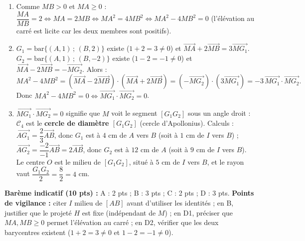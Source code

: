 \documentclass[11pt]{article}
\begin{document}
\begin{corrige}
\begin{enumerate}
\item Comme $MB>0$ et $MA\ge 0$ : $\dfrac{MA}{MB}=2\iff MA=2MB\iff MA^2=4MB^2\iff MA^2-4MB^2=0$ (l'élévation au carré est licite car les deux membres sont positifs).
\item $G_1=\mathrm{bar}\{(A,1)\,;\,(B,2)\}$ existe ($1+2=3\neq 0$) et $\overrightarrow{MA}+2\overrightarrow{MB}=3\overrightarrow{MG_1}$. $G_2=\mathrm{bar}\{(A,1)\,;\,(B,-2)\}$ existe ($1-2=-1\neq 0$) et $\overrightarrow{MA}-2\overrightarrow{MB}=-\overrightarrow{MG_2}$. Alors :
\[ MA^2-4MB^2=(\overrightarrow{MA}-2\overrightarrow{MB})\cdot(\overrightarrow{MA}+2\overrightarrow{MB})=(-\overrightarrow{MG_2})\cdot(3\overrightarrow{MG_1})=-3\,\overrightarrow{MG_1}\cdot\overrightarrow{MG_2}. \]
Donc $MA^2-4MB^2=0\iff\overrightarrow{MG_1}\cdot\overrightarrow{MG_2}=0$.
\item $\overrightarrow{MG_1}\cdot\overrightarrow{MG_2}=0$ signifie que $M$ voit le segment $[G_1G_2]$ sous un angle droit : $\mathcal{C}_4$ est le \textbf{cercle de diamètre $[G_1G_2]$} (cercle d'Apollonius). Calculs : $\overrightarrow{AG_1}=\dfrac{2}{3}\overrightarrow{AB}$, donc $G_1$ est à $4$ cm de $A$ vers $B$ (soit à $1$ cm de $I$ vers $B$) ; $\overrightarrow{AG_2}=\dfrac{-2}{-1}\overrightarrow{AB}=2\overrightarrow{AB}$, donc $G_2$ est à $12$ cm de $A$ (soit à $9$ cm de $I$ vers $B$). Le centre $O$ est le milieu de $[G_1G_2]$, situé à $5$ cm de $I$ vers $B$, et le rayon vaut $\dfrac{G_1G_2}{2}=\dfrac{8}{2}=4$ cm.
\end{enumerate}
\textbf{Barème indicatif (10 pts) :} A : 2 pts ; B : 3 pts ; C : 2 pts ; D : 3 pts.
\textbf{Points de vigilance :} citer $I$ milieu de $[AB]$ avant d'utiliser les identités ; en B, justifier que le projeté $H$ est fixe (indépendant de $M$) ; en D1, préciser que $MA,MB\ge 0$ permet l'élévation au carré ; en D2, vérifier que les deux barycentres existent ($1+2=3\neq 0$ et $1-2=-1\neq 0$).
\end{corrige}
\end{document}

